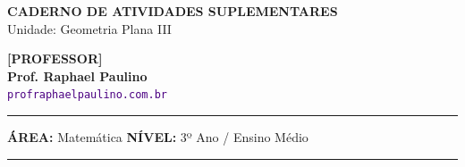 
\usepackage{titlesec}
\titleformat{\section}{\color{black}\large\bfseries}{\thesection}{0em}{\vspace{0.1cm}\titlerule[0.8pt]}
\titlespacing*{\section}{0pt}{10pt}{6pt} 
\titleformat{\subsubsection}[runin]{\color{black}\bfseries}{}{0em}{}
\titlespacing*{\subsubsection}{0pt}{0pt}{0.15cm}

\usepackage{multicol}
\setlength{\columnsep}{1cm}
\setlength{\columnseprule}{0.5pt}
\def\columnseprulecolor{\color{CorLinha}}
\usepackage{adjustbox, tikz, pgfplots, circuitikz}
\usetikzlibrary{shadows, shapes.misc, positioning, calc}
\pgfplotsset{compat=1.18}


\thispagestyle{empty}
\color{Cinzablack}
\vspace*{-1.8cm}

\noindent
\begin{minipage}{\textwidth}
    \selectfont
    \noindent
    \begin{minipage}[t]{0.65\linewidth}
        {\Large \bfseries \MakeUppercase{Caderno de Atividades Suplementares}}\\[0.1cm]
        {\large \textmd{\textcolor{CinzaEscuro}{Unidade: Geometria Plana III}}}
    \end{minipage}%
    \begin{minipage}[t]{0.35\linewidth}
        \raggedleft
        \ifgabarito
            {\large \bfseries \textcolor{CorTitUm}{[PROFESSOR]}}\\[0.05cm]
        \fi
        \small \textbf{Prof. Raphael Paulino}\\
        \textsf{\small \textcolor{indigo}{\texttt{profraphaelpaulino.com.br}}}
    \end{minipage}
    
    \vspace{0.15cm}
    \noindent\rule{\linewidth}{1.2pt}
    \vspace{-0.1cm}
    \footnotesize\textsf{\textbf{ÁREA:} Matemática \hfill \textbf{NÍVEL:} 3º Ano / Ensino Médio}
    \vspace{0.1cm}
    \noindent\rule{\linewidth}{0.4pt}
\end{minipage}

